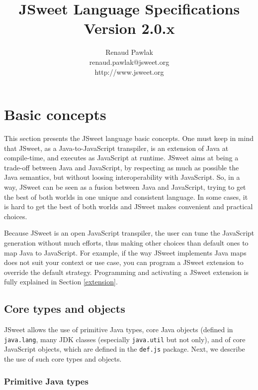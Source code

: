 \documentclass[a4paper]{report}
\begin{document}
\title{JSweet Language Specifications\\{\large Version 2.0.x}}
\author{%
Renaud Pawlak\\
{\normalsize renaud.pawlak@jsweet.org}\\
{\normalsize http://www.jsweet.org}\\
}%
\date{}
\maketitle

\tableofcontents

\chapter{Basic concepts} 

This section presents the JSweet language basic concepts. One must keep in mind that JSweet, as a Java-to-JavaScript transpiler, is an extension of Java at compile-time, and executes as JavaScript at runtime. JSweet aims at being a trade-off between Java and JavaScript, by respecting as much as possible the Java semantics, but without loosing interoperability with JavaScript. So, in a way, JSweet can be seen as a fusion between Java and JavaScript, trying to get the best of both worlds in one unique and consistent language. In some cases, it is hard to get the best of both worlds and JSweet makes convenient and practical choices.

Because JSweet is an open JavaScript transpiler, the user can tune the JavaScript generation without much efforts, thus making other choices than default ones to map Java to JavaScript. For example, if the way JSweet implements Java maps does not suit your context or use case, you can program a JSweet extension to override the default strategy. Programming and activating a JSweet extension is fully explained in Section \ref{extension}.

\section{Core types and objects}

JSweet allows the use of primitive Java types, core Java objects (defined in \texttt{java.lang}, many JDK classes (especially \texttt{java.util} but not only), and of core JavaScript objects, which are defined in the \texttt{def.js} package. Next, we describe the use of such core types and objects.

\subsection{Primitive Java types}
\end{document}
